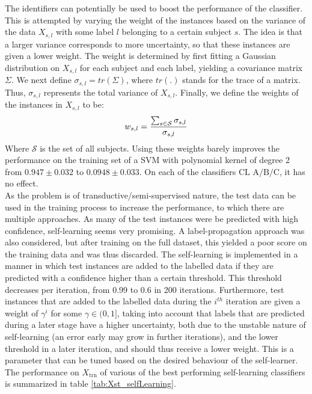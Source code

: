 \documentclass [a4paper] {report}
\begin{document}
	\noindent
	The identifiers can potentially be used to boost the performance of the classifier. This is attempted by varying the weight of the instances based on the variance of the data $X_{s,l}$ with some label $l$ belonging to a certain subject $s$. The idea is that a larger variance corresponds to more uncertainty, so that these instances are given a lower weight. The weight is determined by first fitting a Gaussian distribution on $X_{s,l}$ for each subject and each label, yielding a covariance matrix $\Sigma$. We next define $\sigma_{s,l} = tr(\Sigma)$, where $tr(.)$ stands for the trace of a matrix. Thus, $\sigma_{s,l}$ represents the total variance of $X_{s,l}$. Finally, we define the weights of the instances in $X_{s,l}$ to be:
	$$ w_{s,l} = { \sum_{s\in\mathcal{S}}\sigma_{s,l} \over \sigma_{s,l} } $$
	Where $\mathcal{S}$ is the set of all subjects. Using these weights barely improves the performance on the training set of a SVM with polynomial kernel of degree 2 from $0.947 \pm 0.032$ to $0.0948 \pm 0.033$. On each of the classifiers $\text{CL A/B/C}$, it has no effect.\\
	
	\noindent
	As the problem is of transductive/semi-supervised nature, the test data can be used in the training process to increase the performance, to which there are multiple approaches. As many of the test instances were be predicted with high confidence, self-learning  seems very promising. A label-propagation approach was also considered, but after training on the full dataset, this yielded a poor score on the training data and was thus discarded. The self-learning is implemented in a manner in which test instances are added to the labelled data if they are predicted with a confidence higher than a certain threshold. This threshold decreases per iteration, from 0.99 to 0.6 in 200 iterations. Furthermore, test instances that are added to the labelled data during the $i^{th}$ iteration are given a weight of $\gamma^{i}$ for some $\gamma \in (0,1]$, taking into account that labels that are predicted during a later stage have a higher uncertainty, both due to the unstable nature of self-learning (an error early may grow in further iterations), and the lower threshold in a later iteration, and should thus receive a lower weight. This is a parameter that can be tuned based on the desired behaviour of the self-learner.\\
		
	\noindent
	The performance on $X_{\text{trn}}$ of various of the best performing self-learning classifiers is summarized in table \ref{tab:Xst_selfLearning}.
	
\end{document}
